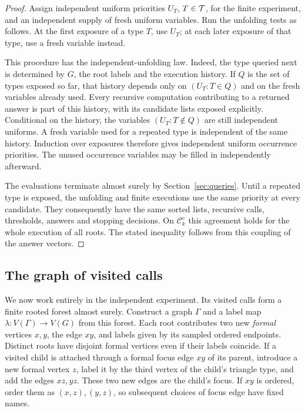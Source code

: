 \begin{proof}
Assign independent uniform priorities $U_T$, $T\in\mathcal T$, for the finite
experiment, and an independent supply of fresh uniform variables.
Run the unfolding tests as follows.  At the first exposure of a type
$T$, use $U_T$; at each later exposure of that type, use a fresh
variable instead.

This procedure has the independent-unfolding law.  Indeed, the type
queried next is determined by $G$, the root labels and the execution
history.  If $Q$ is the set of types exposed so far, that history
depends only on $(U_T:T\in Q)$ and on the fresh variables already
used.  Every recursive computation contributing to a returned answer
is part of this history, with its candidate lists exposed explicitly.
Conditional on the history, the variables $(U_T:T\notin Q)$ are still
independent uniforms.  A fresh variable used for a repeated type is
independent of the same history.  Induction over exposures therefore
gives independent uniform occurrence priorities.  The unused
occurrence variables may be filled in independently afterward.

The evaluations terminate almost surely by Section~\ref{sec:queries}.
Until a repeated type is exposed, the unfolding and finite executions
use the same priority at every candidate.  They consequently have the
same sorted lists, recursive calls, thresholds, answers and stopping
decisions.  On $\mathcal C_k^c$ this agreement holds for the whole
execution of all roots.  The stated inequality follows from this
coupling of the answer vectors.
\end{proof}

\subsection{The graph of visited calls}

We now work entirely in the independent experiment.  Its visited calls
form a finite rooted forest almost surely.  Construct a graph $\Gamma$
and a label map $\lambda:V(\Gamma)\to V(G)$ from this forest.
Each root contributes two new \emph{formal} vertices $x,y$, the edge
$xy$, and labels given by its sampled ordered endpoints.  Distinct
roots have disjoint formal vertices even if their labels coincide.
If a visited child is attached through a formal focus edge $xy$ of its
parent, introduce a new formal vertex $z$, label it by the third
vertex of the child's triangle type, and add the edges $xz,yz$.
These two new edges are the child's focus.  If $xy$ is ordered, order
them as $(x,z),(y,z)$, so subsequent choices of focus edge have fixed
names.

